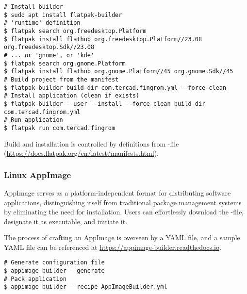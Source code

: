 \begin{lstlisting}[language=terminal]
# Install builder
$ sudo apt install flatpak-builder
# 'runtime' definition
$ flatpak search org.freedesktop.Platform
$ flatpak install flathub org.freedesktop.Platform//23.08 org.freedesktop.Sdk//23.08
# ... or 'gnome', or 'kde'
$ flatpak search org.gnome.Platform
$ flatpak install flathub org.gnome.Platform//45 org.gnome.Sdk//45
# Build project from the manifest
$ flatpak-builder build-dir com.tercad.fingrom.yml --force-clean
# Install application (clean if exists)
$ flatpak-builder --user --install --force-clean build-dir com.tercad.fingrom.yml
# Run application
$ flatpak run com.tercad.fingrom
\end{lstlisting}

\noindent Build and installation is controlled by definitions from -file
(\href{https://docs.flatpak.org/en/latest/manifests.html}{https://docs.flatpak.org/en/latest/manifests.html}).


\subsubsection{Linux AppImage}

AppImage serves as a platform-independent format for distributing software applications, distinguishing itself from 
traditional package management systems by eliminating the need for installation. Users can effortlessly download the 
-file, designate it as executable, and initiate it.

The process of crafting an AppImage is overseen by a YAML file, and a sample YAML file can be referenced at 
\href{https://appimage-builder.readthedocs.io}{https://appimage-builder.readthedocs.io}.

\begin{lstlisting}[language=terminal]
# Generate configuration file
$ appimage-builder --generate
# Pack application
$ appimage-builder --recipe AppImageBuilder.yml
\end{lstlisting}
